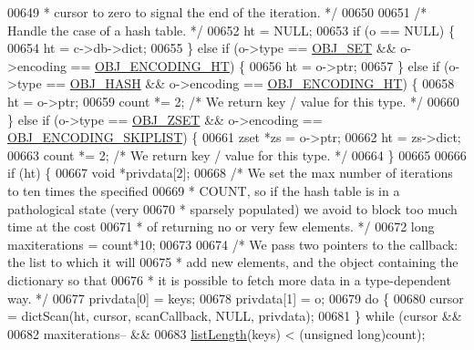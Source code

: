 \begin{DoxyCode}
00649 \textcolor{comment}{     * cursor to zero to signal the end of the iteration. */}
00650 
00651     \textcolor{comment}{/* Handle the case of a hash table. */}
00652     ht = NULL;
00653     \textcolor{keywordflow}{if} (o == NULL) \{
00654         ht = c->db->dict;
00655     \} \textcolor{keywordflow}{else} \textcolor{keywordflow}{if} (o->type == \hyperlink{server_8h_a8d179375a4aac33d3fa7aa80c8ccc75f}{OBJ\_SET} && o->encoding == \hyperlink{server_8h_a9c10219f68afc557d510d108257d238b}{OBJ\_ENCODING\_HT}) \{
00656         ht = o->ptr;
00657     \} \textcolor{keywordflow}{else} \textcolor{keywordflow}{if} (o->type == \hyperlink{server_8h_a87c05ba4f7f36741864277f02a4423fb}{OBJ\_HASH} && o->encoding == 
      \hyperlink{server_8h_a9c10219f68afc557d510d108257d238b}{OBJ\_ENCODING\_HT}) \{
00658         ht = o->ptr;
00659         count *= 2; \textcolor{comment}{/* We return key / value for this type. */}
00660     \} \textcolor{keywordflow}{else} \textcolor{keywordflow}{if} (o->type == \hyperlink{server_8h_a8c356422ddbc03bd77694880a30a1953}{OBJ\_ZSET} && o->encoding == 
      \hyperlink{server_8h_acfb35db5cb30ed113ed23aeb1a224c4c}{OBJ\_ENCODING\_SKIPLIST}) \{
00661         zset *zs = o->ptr;
00662         ht = zs->dict;
00663         count *= 2; \textcolor{comment}{/* We return key / value for this type. */}
00664     \}
00665 
00666     \textcolor{keywordflow}{if} (ht) \{
00667         \textcolor{keywordtype}{void} *privdata[2];
00668         \textcolor{comment}{/* We set the max number of iterations to ten times the specified}
00669 \textcolor{comment}{         * COUNT, so if the hash table is in a pathological state (very}
00670 \textcolor{comment}{         * sparsely populated) we avoid to block too much time at the cost}
00671 \textcolor{comment}{         * of returning no or very few elements. */}
00672         \textcolor{keywordtype}{long} maxiterations = count*10;
00673 
00674         \textcolor{comment}{/* We pass two pointers to the callback: the list to which it will}
00675 \textcolor{comment}{         * add new elements, and the object containing the dictionary so that}
00676 \textcolor{comment}{         * it is possible to fetch more data in a type-dependent way. */}
00677         privdata[0] = keys;
00678         privdata[1] = o;
00679         \textcolor{keywordflow}{do} \{
00680             cursor = dictScan(ht, cursor, scanCallback, NULL, privdata);
00681         \} \textcolor{keywordflow}{while} (cursor &&
00682               maxiterations-- &&
00683               \hyperlink{adlist_8h_afde0ab079f934670e82119b43120e94b}{listLength}(keys) < (\textcolor{keywordtype}{unsigned} \textcolor{keywordtype}{long})count);

\end{DoxyCode}
